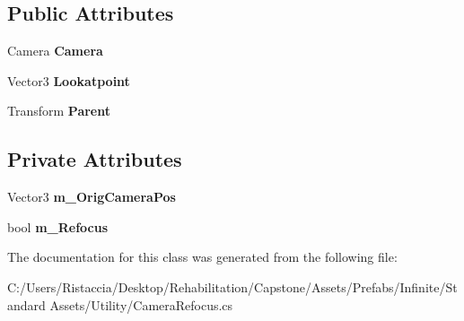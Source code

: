 \subsection*{Public Attributes}
\begin{DoxyCompactItemize}
\item 
\mbox{\label{class_unity_standard_assets_1_1_utility_1_1_camera_refocus_af2e66852407defac8d42928618ac667f}} 
Camera {\bfseries Camera}
\item 
\mbox{\label{class_unity_standard_assets_1_1_utility_1_1_camera_refocus_a1befa53fb7728dcc2fa0e4862dd60543}} 
Vector3 {\bfseries Lookatpoint}
\item 
\mbox{\label{class_unity_standard_assets_1_1_utility_1_1_camera_refocus_ab5d9f1645e7f5f07c617be54fe20bd14}} 
Transform {\bfseries Parent}
\end{DoxyCompactItemize}
\subsection*{Private Attributes}
\begin{DoxyCompactItemize}
\item 
\mbox{\label{class_unity_standard_assets_1_1_utility_1_1_camera_refocus_abb8d88872967a25a234d1346faacbd32}} 
Vector3 {\bfseries m\+\_\+\+Orig\+Camera\+Pos}
\item 
\mbox{\label{class_unity_standard_assets_1_1_utility_1_1_camera_refocus_adcb001c5f052732aaae29e3744c25801}} 
bool {\bfseries m\+\_\+\+Refocus}
\end{DoxyCompactItemize}


The documentation for this class was generated from the following file\+:\begin{DoxyCompactItemize}
\item 
C\+:/\+Users/\+Ristaccia/\+Desktop/\+Rehabilitation/\+Capstone/\+Assets/\+Prefabs/\+Infinite/\+Standard Assets/\+Utility/Camera\+Refocus.\+cs\end{DoxyCompactItemize}

